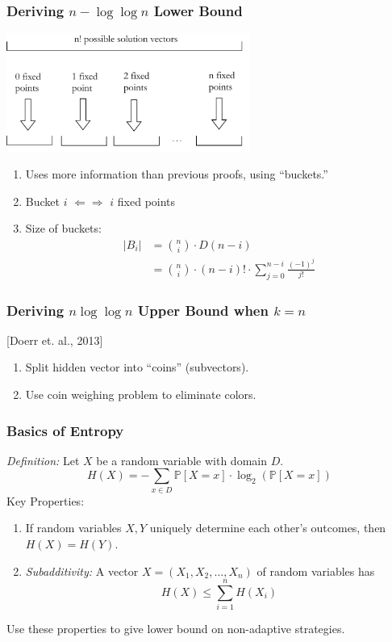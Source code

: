 \documentclass{beamer}
\begin{document}
    \begin{frame}
    \frametitle{Deriving $n-\log\log n$ Lower Bound}
   		\begin{center}
		\includegraphics[keepaspectratio=true, width=0.6\textwidth]{buckets.pdf}
		\end{center}
		\begin{enumerate}[label=\roman*.]
		\item Uses more information than previous proofs, using ``buckets.''
		\item Bucket $i$ $\Leftarrow\Rightarrow$ $i$ fixed points
		\item Size of buckets:
			\begin{align*}
			|B_i| & = \binom{n}{i}\cdot D(n-i)\\
			& = \binom{n}{i} \cdot(n-i)!\cdot\sum_{j=0}^{n-i}\frac{(-1)^j}{j!}
			\end{align*}
		\end{enumerate}
    \end{frame}
    
    \begin{frame}
    \frametitle{Deriving $n\log\log n$ Upper Bound when $k=n$}
    [Doerr et. al., 2013]
    	\begin{enumerate}[label=\roman*.]
		\item Split hidden vector into ``coins'' (subvectors).
		\item Use coin weighing problem to eliminate colors.
		\end{enumerate}
    \end{frame}
    
    \begin{frame}
    \frametitle{Basics of Entropy}
	\textit{Definition:} Let $X$ be a random variable with domain $D$.
			\begin{equation*}
			H(X) = -\sum_{x\in D}\mathbb{P}[X=x]\cdot\log_2\left(\mathbb{P}[X=x]\right)
			\end{equation*}
	Key Properties:
    	\begin{enumerate}[label=\roman*.]
		\item If random variables $X,Y$ uniquely determine each other's outcomes,
		then $H(X)=H(Y)$.
		\item \textit{Subadditivity:} A vector $X=(X_1, X_2, \ldots, X_n)$ of random
		variables has
			\begin{equation*}
			H(X)\le \sum_{i=1}^{n}H(X_i)
			\end{equation*}
		\end{enumerate}
	Use these properties to give lower bound on non-adaptive strategies.
    \end{frame}
    
\end{document}
